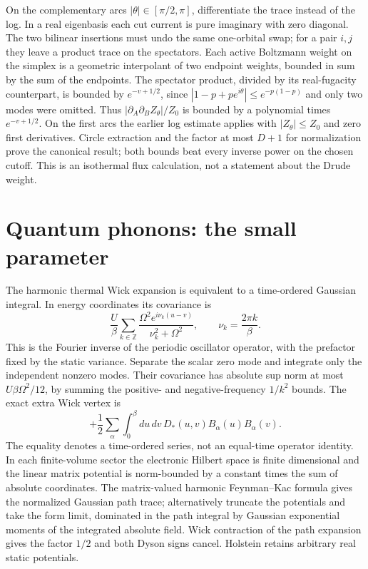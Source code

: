 \documentclass[11pt]{article}
\begin{document}
On the complementary arcs $|\theta|\in[\pi/2,\pi]$, differentiate the trace instead of the log. In a real eigenbasis each cut current is pure imaginary with zero diagonal. The two bilinear insertions must undo the same one-orbital swap; for a pair $i,j$ they leave a product trace on the spectators. Each active Boltzmann weight on the simplex is a geometric interpolant of two endpoint weights, bounded in sum by the sum of the endpoints. The spectator product, divided by its real-fugacity counterpart, is bounded by $e^{-v+1/2}$, since $|1-p+p e^{i\theta}|\le e^{-p(1-p)}$ and only two modes were omitted. Thus $|\partial_A\partial_B Z_\theta|/Z_0$ is bounded by a polynomial times $e^{-v+1/2}$. On the first arcs the earlier log estimate applies with $|Z_\theta|\le Z_0$ and zero first derivatives. Circle extraction and the factor at most $D+1$ for normalization prove the canonical result; both bounds beat every inverse power on the chosen cutoff. This is an isothermal flux calculation, not a statement about the Drude weight.

\section{Quantum phonons: the small parameter}
The harmonic thermal Wick expansion is equivalent to a time-ordered Gaussian integral. In energy coordinates its covariance is
\[
 \frac U\beta\sum_{k\in\mathbb Z}\frac{\Omega^2 e^{i\nu_k(u-v)}}{\nu_k^2+\Omega^2},\qquad \nu_k=\frac{2\pi k}{\beta}.
\]
This is the Fourier inverse of the periodic oscillator operator, with the prefactor fixed by the static variance. Separate the scalar zero mode and integrate only the independent nonzero modes. Their covariance has absolute sup norm at most $U\beta\Omega^2/12$, by summing the positive- and negative-frequency $1/k^2$ bounds. The exact extra Wick vertex is
\[
 +\frac12\sum_\alpha\int_0^\beta du\,dv\,D_*(u,v)B_\alpha(u)B_\alpha(v).
\]
The equality denotes a time-ordered series, not an equal-time operator identity. In each finite-volume sector the electronic Hilbert space is finite dimensional and the linear matrix potential is norm-bounded by a constant times the sum of absolute coordinates. The matrix-valued harmonic Feynman--Kac formula gives the normalized Gaussian path trace; alternatively truncate the potentials and take the form limit, dominated in the path integral by Gaussian exponential moments of the integrated absolute field. Wick contraction of the path expansion gives the factor $1/2$ and both Dyson signs cancel. Holstein retains arbitrary real static potentials.
\end{document}
